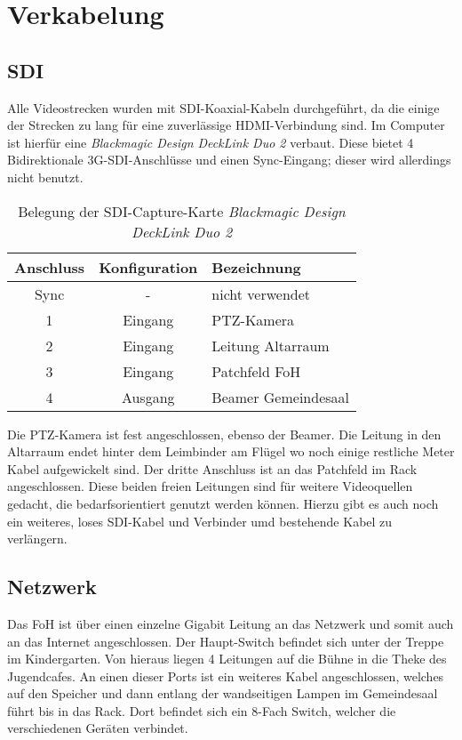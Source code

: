 \chapter{Verkabelung}
	\section{SDI}
		Alle Videostrecken wurden mit \Gls{SDI}-Koaxial-Kabeln durchgeführt, da die einige der Strecken zu lang für eine zuverlässige HDMI-Verbindung sind.
		Im Computer ist hierfür eine \textit{Blackmagic Design DeckLink Duo 2} verbaut.
		Diese bietet 4 Bidirektionale 3G-\Gls{SDI}-Anschlüsse und einen Sync-Eingang; dieser wird allerdings nicht benutzt.

		\begin{table}[H]
			\caption{Belegung der \Gls{SDI}-Capture-Karte \textit{Blackmagic Design DeckLink Duo 2}}
			\centering
			
			\begin{tabular}{ccl}
				\toprule
				Anschluss & Konfiguration & Bezeichnung \\
				\midrule
				Sync & - & nicht verwendet \\
				1 & Eingang & \Gls{PTZ-Kamera} \\
				2 & Eingang & Leitung Altarraum \\
				3 & Eingang & Patchfeld \Gls{FoH} \\
				4 & Ausgang & Beamer Gemeindesaal \\
				\bottomrule
			\end{tabular}
		\end{table}

		Die PTZ-Kamera ist fest angeschlossen, ebenso der Beamer.
		Die Leitung in den Altarraum endet hinter dem Leimbinder am Flügel wo noch einige restliche Meter Kabel aufgewickelt sind.
		Der dritte Anschluss ist an das Patchfeld im Rack angeschlossen.
		Diese beiden freien Leitungen sind für weitere Videoquellen gedacht, die bedarfsorientiert genutzt werden können.
		Hierzu gibt es auch noch ein weiteres, loses \Gls{SDI}-Kabel und Verbinder umd bestehende Kabel zu verlängern.

	\section{Netzwerk}
		Das \Gls{FoH} ist über einen einzelne Gigabit Leitung an das Netzwerk und somit auch an das Internet angeschlossen.
		Der Haupt-Switch befindet sich unter der Treppe im Kindergarten.
		Von hieraus liegen 4 Leitungen auf die Bühne in die Theke des Jugendcafes.
		An einen dieser Ports ist ein weiteres Kabel angeschlossen, welches auf den Speicher und dann entlang der wandseitigen Lampen im Gemeindesaal führt bis in das Rack.
		Dort befindet sich ein 8-Fach Switch, welcher die verschiedenen Geräten verbindet.

